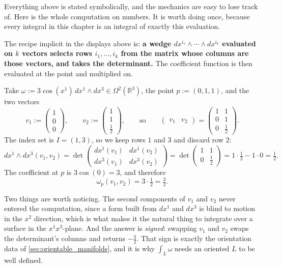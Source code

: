 \begin{aiexample}
\label{ex:evaluating_a_two_form}
Everything above is stated symbolically, and the mechanics are easy to lose track of. Here is
the whole computation on numbers. It is worth doing once, because every integral in this chapter
is an integral of exactly this evaluation.

The recipe implicit in the displays above is: \textbf{a wedge $dx^{i_1}\wedge\cdots\wedge
dx^{i_k}$ evaluated on $k$ vectors selects rows $i_1,\dots,i_k$ from the matrix whose columns are
those vectors, and takes the determinant.} The coefficient function is then evaluated at the
point and multiplied on.

Take $\omega := 3\cos(x^1)\,dx^1\wedge dx^3 \in \Omega^2(\mathbb{R}^3)$, the point
$p := (0,1,1)$, and the two vectors
\[v_1 := \begin{pmatrix}1\\0\\0\end{pmatrix}, \qquad
  v_2 := \begin{pmatrix}1\\1\\\tfrac12\end{pmatrix},
  \qquad\text{so}\qquad
  \begin{pmatrix} v_1 & v_2\end{pmatrix} = \begin{pmatrix}
    1 & 1 \\ 0 & 1 \\ 0 & \tfrac12 \end{pmatrix}.\]
The index set is $I = (1,3)$, so we keep rows $1$ and $3$ and discard row $2$:
\[dx^1\wedge dx^3(v_1,v_2) = \det\begin{pmatrix}
  dx^1(v_1) & dx^1(v_2) \\ dx^3(v_1) & dx^3(v_2)\end{pmatrix}
  = \det\begin{pmatrix} 1 & 1 \\ 0 & \tfrac12\end{pmatrix}
  = 1\cdot\tfrac12 - 1\cdot 0 = \tfrac12.\]
The coefficient at $p$ is $3\cos(0) = 3$, and therefore
\[\omega_p(v_1,v_2) = 3 \cdot \tfrac12 = \tfrac32.\]

Two things are worth noticing. The second components of $v_1$ and $v_2$ never entered the
computation, since a form built from $dx^1$ and $dx^3$ is blind to motion in the $x^2$
direction, which is what makes it the natural thing to integrate over a surface in the
$x^1x^3$-plane. And the answer is \emph{signed}: swapping $v_1$ and $v_2$ swaps the determinant's
columns and returns $-\tfrac32$. That sign is exactly the orientation data of
\cref{sec:orientable_manifolds}, and it is why $\int_L\omega$ needs an oriented $L$ to be
well defined.
\end{aiexample}

